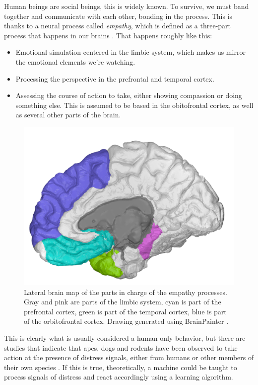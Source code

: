\documentclass[review]{elsarticle} %
\begin{document}
Human beings are social beings, this is widely known. To survive, we must band together and communicate with each other, bonding in the process. This is thanks to a neural process called \textit{empathy}, which is defined as a three-part process that happens in our brains \citep{rf1}. That happens roughly like this:
\begin{itemize}
	\item Emotional simulation centered in the limbic system, which makes us mirror the emotional elements we're watching.
	\item Processing the perspective in the prefrontal and temporal cortex.
	\item Assessing the course of action to take, either showing compassion or doing something else. This is assumed to be based in the obitofrontal cortex, as well as several other parts of the brain.	
\end{itemize}
\begin{figure}[!h]
	\centering
	\includegraphics[scale=0.2]{BrainMap}
	\caption[Lateral brain map of the parts in charge of empathy processes.]{Lateral brain map of the parts in charge of the empathy processes. Gray and pink are parts of the limbic system, cyan is part of the prefrontal cortex, green is part of the temporal cortex, blue is part of the orbitofrontal cortex. Drawing generated using BrainPainter \citep{img1}.}
	\label{fig:brainmap}
\end{figure}
This is clearly what is usually considered a human-only behavior, but there are studies that indicate that apes, dogs and rodents have been observed to take action at the presence of distress signals, either from humans or other members of their own species \citep{rf2}.
If this is true, theoretically, a machine could be taught to process signals of distress and react accordingly using a learning algorithm.
\pagebreak
\end{document}
